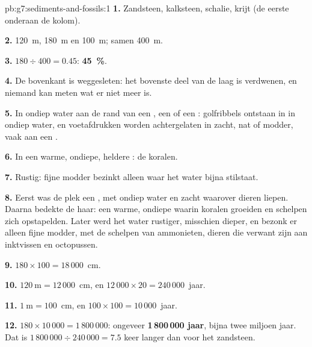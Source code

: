 \begin{solution}{pb:g7:sediments-and-fossils:1}
\textbf{1.} Zandsteen, kalksteen, schalie, krijt (de eerste onderaan de
kolom).

\textbf{2.} \qty{120}{m}, \qty{180}{m} en \qty{100}{m}; samen
\qty{400}{m}.

\textbf{3.} $180 \div 400 = 0.45$: \textbf{45~\%}.

\textbf{4.} De bovenkant is weggesleten: het bovenste deel van de laag is
verdwenen, en niemand kan meten wat er niet meer is.

\textbf{5.} In ondiep water aan de rand van een , een  of een
: golfribbels ontstaan in  in ondiep water, en voetafdrukken worden
achtergelaten in zacht, nat  of modder, vaak aan een .

\textbf{6.} In een warme, ondiepe, heldere : de koralen.

\textbf{7.} Rustig: fijne modder bezinkt alleen waar het water bijna stilstaat.

\textbf{8.} Eerst was de plek een , met ondiep water en zacht 
waarover dieren liepen. Daarna bedekte de  haar: een warme, ondiepe 
waarin koralen groeiden en schelpen zich opstapelden. Later werd het water
rustiger, misschien dieper, en bezonk er alleen fijne modder, met de
schelpen van ammonieten, dieren die verwant zijn aan inktvissen en
octopussen.

\textbf{9.} $180 \times 100 = 18\,000$~cm.

\textbf{10.} $120~\text{m} = 12\,000$~cm, en $12\,000 \times 20 =
240\,000$~jaar.

\textbf{11.} $1~\text{m} = 100$~cm, en $100 \times 100 = 10\,000$~jaar.

\textbf{12.} $180 \times 10\,000 = 1\,800\,000$: ongeveer
\textbf{1\,800\,000 jaar}, bijna twee miljoen jaar. Dat is
$1\,800\,000 \div 240\,000 = 7.5$ keer langer dan voor het zandsteen.
\end{solution}
